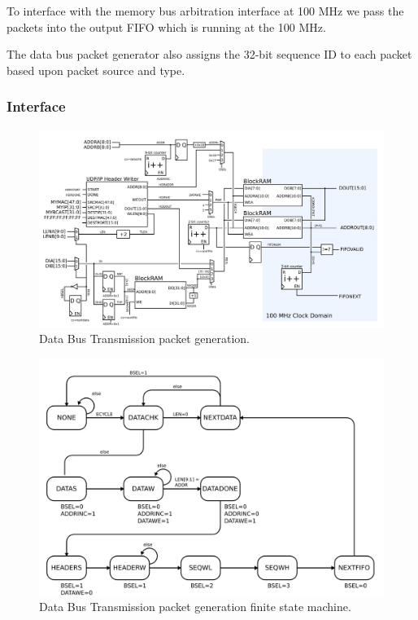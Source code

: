 To interface with the memory bus arbitration interface at 100 MHz we
pass the packets into the output FIFO which is running at the 100 MHz.

The data bus packet generator also assigns the 32-bit sequence ID to
each packet based upon packet source and type.

\subsubsection{Interface}
\begin{figure}
\begin{centering}
\includegraphics[scale=0.8]{data.packetgen.svg}
\end{centering}
\caption{Data Bus Transmission packet generation.}
\label{data.packetgen}
\end{figure}

\begin{figure}
\begin{centering}
\includegraphics[scale=0.8]{data.packetgen.fsm.svg}
\end{centering}
\caption{Data Bus Transmission packet generation finite state machine.}
\label{data.packetgen.fsm}
\end{figure}

